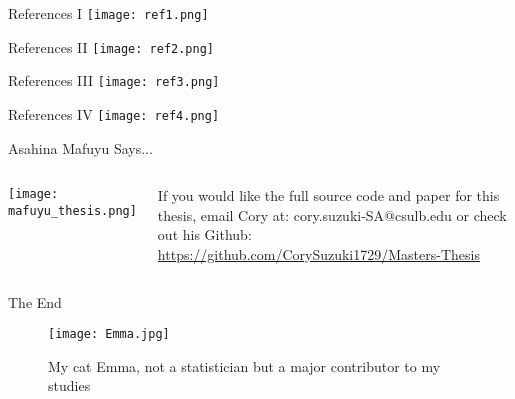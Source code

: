 \documentclass[aspectratio=169,xcolor=dvipsnames]{beamer}
\begin{document}


%     
%     

\begin{frame}{References I}
\texttt{[image: ref1.png]}
\end{frame}

\begin{frame}{References II}
\texttt{[image: ref2.png]}
\end{frame}

\begin{frame}{References III}
\texttt{[image: ref3.png]}
\end{frame}

\begin{frame}{References IV}
\texttt{[image: ref4.png]}
\end{frame}


\begin{frame}{Asahina Mafuyu Says...}
        \begin{columns}[c] %

        \texttt{[image: mafuyu\_thesis.png]}

        If you would like the full source code and paper for this thesis, email Cory at: cory.suzuki-SA@csulb.edu or check out his Github: \url{https://github.com/CorySuzuki1729/Masters-Thesis}

    \end{columns}
\end{frame}

\begin{frame}{The End}
    \begin{figure}
        \centering
        \texttt{[image: Emma.jpg]}
        \caption{My cat Emma, not a statistician but a major contributor to my studies}
    \end{figure}
\end{frame}

\end{document}
